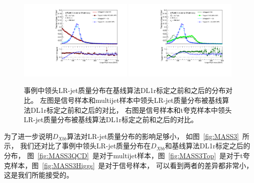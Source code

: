 \begin{figure}[h]
  \begin{center}
    \includegraphics[width=0.49\textwidth]{figuresXbb/efficiencies/dijetcomp_all_largeRjet_jetjet_JZ_mass_inclusive_discDL1rBaselinezoom.pdf}
    \includegraphics[width=0.49\textwidth]{figuresXbb/efficiencies/ttcomp_all_largeRjet_tt_mass_inclusive_discDL1rBaselinezoom.pdf}
  \end{center}
  \caption{事例中领头LR-jet质量分布在基线算法DL1r标定之前和之后的分布对比。
 左图是信号样本和multijet样本中领头LR-jet质量分布被基线算法DL1r标定之前和之后的对比，
 右图是信号样本和t夸克样本中领头LR-jet质量分布被基线算法DL1r标定之前和之后的对比。}
  \label{fig:MASS2}
\end{figure}

为了进一步说明$D_{Xbb}$算法对LR-jet质量分布的影响足够小，
如图~\ref{fig:MASS3}~所示，
我们还对比了事例中领头LR-jet质量分布在$D_{Xbb}$和基线算法DL1r标定之后的分布，
图~\ref{fig:MASS3QCD}~是对于multijet样本，图~\ref{fig:MASS3Top}~是对于t夸克样本，图~\ref{fig:MASS3Higgs}~是对于信号样本，
可以看到两者的差异都非常小，这是我们所能接受的。



